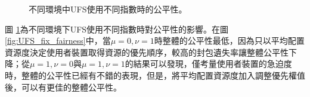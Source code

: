 \begin{figure}[H]
\centering
{}
\caption{\label{fig:UFS_Fairness}不同環境中UFS使用不同指數時的公平性。}
\end{figure}
圖 \ref{fig:UFS_Fairness}為不同環境下UFS使用不同指數時對公平性的影響。在圖 \ref{fig:UFS_fix_fairness}中，當$\mu=0,\nu=1$時整體的公平性最低，因為只以平均配置資源度決定使用者裝置取得資源的優先順序，較高的封包遺失率讓整體公平性下降；從$\mu=1,\nu=0$與$\mu=1,\nu=1$的結果可以發現，僅考量使用者裝置的急迫度時，整體的公平性已經有不錯的表現，但是，將平均配置資源度加入調整優先權值後，可以有更佳的整體公平性。

